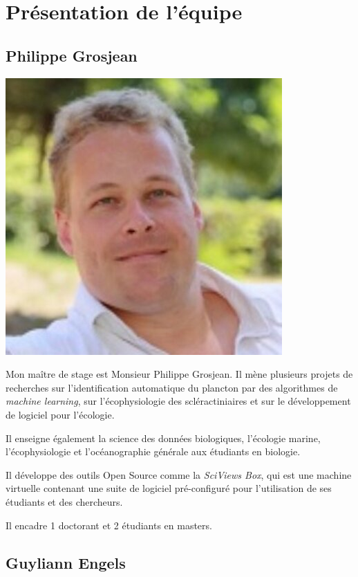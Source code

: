 \documentclass[]{report}
\begin{document}
\section{Présentation de l'équipe}\label{presentation-de-lequipe}

\subsection{Philippe Grosjean}\label{philippe-grosjean}

\includegraphics{../image/Grosjean2.jpg}

Mon maître de stage est Monsieur Philippe Grosjean. Il mène plusieurs
projets de recherches sur l'identification automatique du plancton par
des algorithmes de \emph{machine learning}, sur l'écophysiologie des
scléractiniaires et sur le développement de logiciel pour l'écologie.

Il enseigne également la science des données biologiques, l'écologie
marine, l'écophysiologie et l'océanographie générale aux étudiants en
biologie.

Il développe des outils Open Source comme la \emph{SciViews Box}, qui
est une machine virtuelle contenant une suite de logiciel pré-configuré
pour l'utilisation de ses étudiants et des chercheurs.

Il encadre 1 doctorant et 2 étudiants en masters.

\subsection{Guyliann Engels}\label{guyliann-engels}
\end{document}
